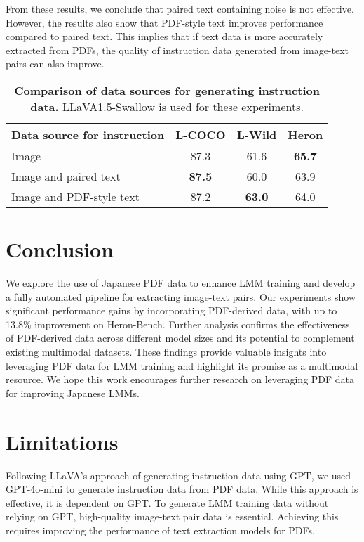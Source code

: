 From these results, we conclude that paired text containing noise is not effective.
However, the results also show that PDF-style text improves performance compared to paired text.
This implies that if text data is more accurately extracted from PDFs, the quality of instruction data generated from image-text pairs can also improve.


\begin{table}[t]
    \centering
    \begin{adjustbox}{width=\linewidth}
    \begin{tabular}{@{}lccc@{}}
        \toprule
        \textbf{Data source for instruction} & \textbf{L-COCO} & \textbf{L-Wild} &  \textbf{Heron} \\
        \midrule
        Image & 87.3 & 61.6 & \textbf{65.7} \\ 
        Image and paired text & \textbf{87.5} & 60.0 & 63.9 \\ 
        Image and PDF-style text & 87.2 & \textbf{63.0} & 64.0 \\
        \bottomrule
    \end{tabular}
    \end{adjustbox}
    \vspace{-2mm}
    \caption{\textbf{Comparison of data sources for generating instruction data.} 
    LLaVA1.5-Swallow is used for these experiments.
    }
    \label{tab:pair-to-inst}
\end{table}

\section{Conclusion}
We explore the use of Japanese PDF data to enhance LMM training and develop a fully automated pipeline for extracting image-text pairs. Our experiments show significant performance gains by incorporating PDF-derived data, with up to 13.8\% improvement on Heron-Bench.
Further analysis confirms the effectiveness of PDF-derived data across different model sizes and its potential to complement existing multimodal datasets. These findings provide valuable insights into leveraging PDF data for LMM training and highlight its promise as a multimodal resource. We hope this work encourages further research on leveraging PDF data for improving Japanese LMMs.


\section*{Limitations}
Following LLaVA’s approach of generating instruction data using GPT, we used GPT-4o-mini to generate instruction data from PDF data.
While this approach is effective, it is dependent on GPT.
To generate LMM training data without relying on GPT, high-quality image-text pair data is essential.
Achieving this requires improving the performance of text extraction models for PDFs.

